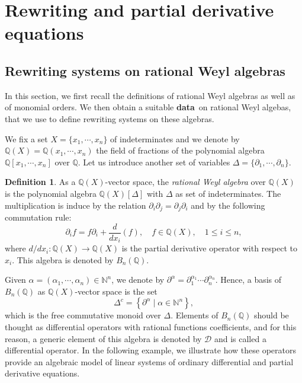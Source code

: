 \documentclass[10pt]{easychair}
\theoremstyle{definition}
\newtheorem{definition}[theorem]{Definition}
\newcommand\data{{\color{red}\bf data}}
\newcommand\diff[1]{\partial_{#1}}
\newcommand\D{\mathcal{D}}
\newcommand\Q{\mathbb{Q}}
\newcommand\N{\mathbb{N}}
\newcommand\QX{\mathbb{Q}[x_1,\cdots,x_n]}
\newcommand\QXX{\mathbb{Q}(x_1,\cdots,x_n)}
\newcommand\Weyl[1]{B_{#1}(\Q)}
\begin{document}
\section{Rewriting and partial derivative equations}
\label{sec:rewriting_systems_and_partial_derivative_equations}

\subsection{Rewriting systems on rational Weyl algebras}
\label{sec:rewriting_systems_on_Weyl_algebras}

In this section, we first recall the definitions of rational Weyl
algebras as well as of monomial orders. We then obtain a suitable \data\
on rational Weyl algebas, that we use to define rewriting systems on 
these algebras.
\medskip


We fix a set $X=\{x_1,\cdots,x_n\}$ of indeterminates
and we denote by $\Q(X)=\QXX$ the field of fractions of the polynomial
algebra $\QX$ over $\Q$. Let us introduce another set of variables
$\Delta=\{\diff{1},\cdots,\diff{n}\}$.
\smallskip

\begin{definition}
  As a $\Q(X)$-vector space, the {\it rational Weyl algebra} over $\Q(X)$
  is the polynomial algebra $\Q(X)[\Delta]$ with $\Delta$ as set of
  indeterminates. The multiplication is induce by the relation
  $\partial_i \partial_j = \partial_j \partial_i$ and by the following
  commutation rule:
  \[\diff{i}f=f\diff{i}+\frac{d}{dx_i}(f),\quad f\in\Q(X),\quad
  1\leq i\leq n,\]
  where $d/dx_i:\Q(X)\to\Q(X)$ is the partial derivative operator with
  respect to~$x_i$. This algebra is denoted by $\Weyl{n}$.
\end{definition}
\smallskip

Given $\alpha=(\alpha_1,\cdots,\alpha_n)\in\N^n$, we denote by 
$\partial^{\alpha}=\diff{1}^{\alpha_1}\cdots\diff{n}^{\alpha_n}$. Hence, 
a basis of $\Weyl{n}$ as $\Q(X)$-vector space is the set
\[\Delta^c=\left\{\partial^\alpha\mid\alpha\in\N^n\right\},\]
which is the free commutative monoid over $\Delta$. Elements of
$\Weyl{n}$ should be thought as differential operators with rational
functions coefficients, and for this reason, a generic element of this
algebra is denoted by $\D$ and is called a differential operator. In the
following example, we illustrate how these operators provide an algebraic
model of linear systems of ordinary differential and partial derivative
equations.
\smallskip
\end{document}
